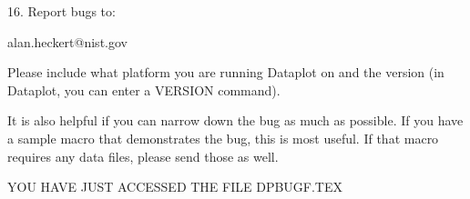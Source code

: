16.
Report bugs to:

   alan.heckert@nist.gov

Please include what platform you are running
Dataplot on and the version (in Dataplot, you
can enter a VERSION command).

It is also helpful if you can narrow down the
bug as much as possible.  If you have a sample
macro that demonstrates the bug, this is most
useful.  If that macro requires any data files,
please send those as well.

YOU HAVE JUST ACCESSED THE FILE DPBUGF.TEX
